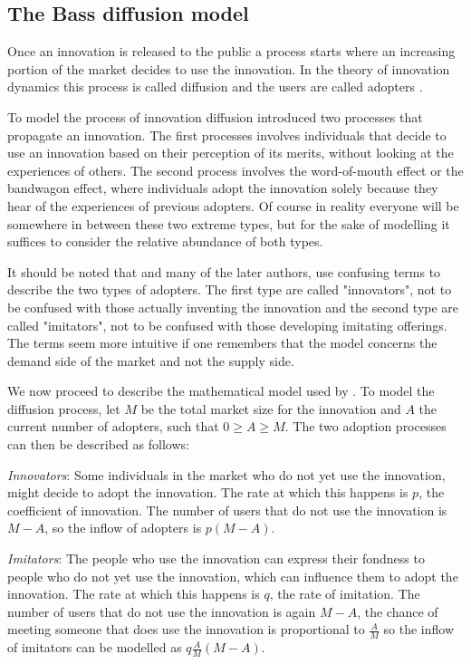 \documentclass[smallextended,final]{svjour3}
\begin{document}
\subsection{The Bass diffusion model}\label{sect:Bass}

Once an innovation is released to the public a process starts where an increasing portion of the market decides to use the innovation. In the theory of innovation dynamics this process is called diffusion and the users are called adopters \citep[see][chapter 4]{narayanan01}.

To model the process of innovation diffusion \citet{bass69} introduced two processes that propagate an innovation. The first processes involves individuals that decide to use an innovation based on their perception of its merits, without looking at the experiences of others. The second process involves the word-of-mouth effect or the bandwagon effect, where individuals adopt the innovation solely because they hear of the experiences of previous adopters. Of course in reality everyone will be somewhere in between these two extreme types, but for the sake of modelling it suffices to consider the relative abundance of both types.

It should be noted that \citet{bass69} and many of the later authors, use confusing terms to describe the two types of adopters. The first type are called "innovators", not to be confused with those actually inventing the innovation and the second type are called "imitators", not to be confused with those developing imitating offerings. The terms seem more intuitive if one remembers that the model concerns the demand side of the market and not the supply side.

We now proceed to describe the mathematical model used by \citet{bass69}. To model the diffusion process, let $M$ be the total market size for the innovation and $A$ the current number of adopters, such that $0 \ge A \ge M$. The two adoption processes can then be described as follows: \citep[see also][]{bass10,mahajan90}

\emph{Innovators}: Some individuals in the market who do not yet use the innovation, might decide to adopt the innovation. The rate at which this happens is $p$, the coefficient of innovation. The number of users that do not use the innovation is $M-A$, so the inflow of adopters is $p(M-A)$.

\emph{Imitators}: The people who use the innovation can express their fondness to people who do not yet use the innovation, which can influence them to adopt the innovation. The rate at which this happens is $q$, the rate of imitation. The number of users that do not use the innovation is again $M-A$, the chance of meeting someone that does use the innovation is proportional to $\frac{A}{M}$ so the inflow of imitators can be modelled as $q\frac{A}{M}(M-A)$.
\end{document}
